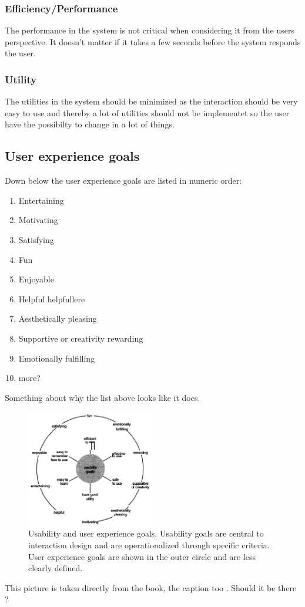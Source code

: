 \subsubsection{Efficiency/Performance}
The performance in the system is not critical when considering it from the users
perspective. It doesn't matter if it takes a few seconds before the system
responds the user.
\subsubsection{Utility}
The utilities in the system should be minimized as the interaction should be
very easy to use and thereby a lot of utilities should not be implementet so the
user have the possibilty to change in a lot of things.
\subsection{User experience goals}
Down below the user experience goals are listed in numeric order:
\begin{enumerate}
	\item Entertaining
	\item Motivating
	\item Satisfying
	\item Fun
	\item Enjoyable
	\item Helpful helpfullere 
	\item Aesthetically pleasing
	\item Supportive or creativity rewarding
	\item Emotionally fulfilling
	\item more?
\end{enumerate}
Something about why the list above looks like it does.

\begin{figure}[h!]		%
 \begin{centering}
  \includegraphics[width=0.5\textwidth]{images/usability_goals_diagram.png}
   \caption{Usability and user experience goals. Usability goals are central to
  			interaction design and are operationalized through specific criteria. 
  			User experience goals are shown in the outer circle and are less clearly defined.}
 \end{centering}
\end{figure}

This picture is taken directly from the book, the caption too . Should it be
there ?
